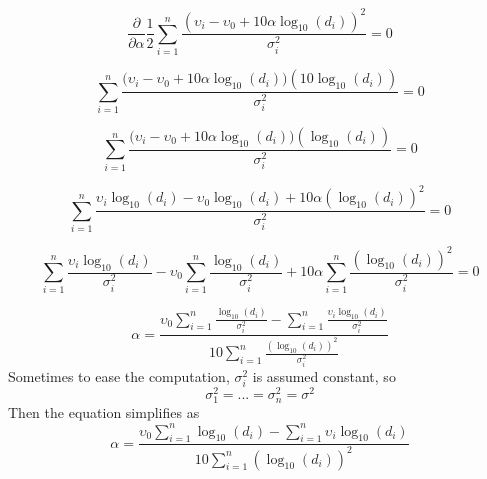 \documentclass[12pt]{report}
\begin{document}
\begin{equation}
\frac{\partial}{\partial \alpha} \frac{1}{2}\sum_{i=1}^n\frac{(\upsilon_i-\upsilon_0+10\alpha\log_{10}(d_i))^2}{\sigma^2_i} =0
\end{equation}

\begin{equation}
\sum_{i=1}^n\frac{\big(\upsilon_i-\upsilon_0+10\alpha\log_{10}(d_i)\big)(10\log_{10}(d_i))}{\sigma^2_i}=0
\end{equation}

\begin{equation}
\sum_{i=1}^n\frac{\big(\upsilon_i-\upsilon_0+10\alpha\log_{10}(d_i)\big)(\log_{10}(d_i))}{\sigma^2_i}=0
\end{equation}

\begin{equation}
\sum_{i=1}^n\frac{\upsilon_i\log_{10}(d_i)-\upsilon_0\log_{10}(d_i)+10\alpha(\log_{10}(d_i))^2}{\sigma^2_i}=0
\end{equation}

\begin{equation}
\sum_{i=1}^n\frac{\upsilon_i\log_{10}(d_i)}{\sigma^2_i}-\upsilon_0\sum_{i=1}^n\frac{\log_{10}(d_i)}{\sigma^2_i}+10\alpha\sum_{i=1}^n\frac{(\log_{10}(d_i))^2}{\sigma^2_i}=0
\end{equation}

\begin{equation}
\alpha=\frac{\upsilon_0\sum_{i=1}^n\frac{\log_{10}(d_i)}{\sigma^2_i}-\sum_{i=1}^n\frac{\upsilon_i\log_{10}(d_i)}{\sigma^2_i}}{10\sum_{i=1}^n\frac{(\log_{10}(d_i))^2}{\sigma^2_i}}
\end{equation}
Sometimes to ease the computation, $\sigma^2_i$ is assumed constant, so $$\sigma_1^2=...=\sigma_n^2=\sigma^2$$ Then the equation simplifies as
\begin{equation}
\alpha=\frac{\upsilon_0\sum_{i=1}^n\log_{10}(d_i)- \sum_{i=1}^n\upsilon_i\log_{10}(d_i)}{10\sum_{i=1}^n(\log_{10}(d_i))^2}
\end{equation}
\end{document}
